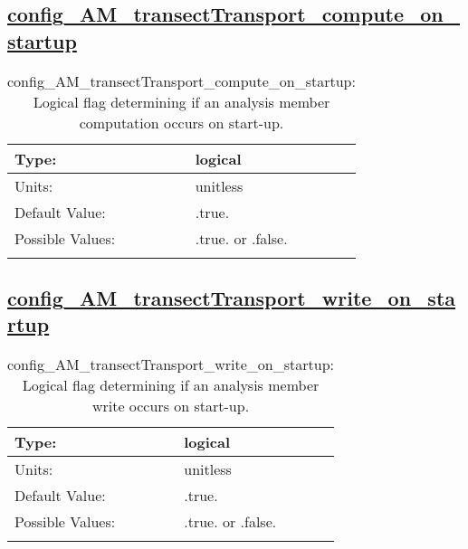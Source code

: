 \subsection[config\_AM\_transectTransport\_compute\_on\_startup]{\hyperref[sec:nm_tab_AM_transectTransport]{config\_AM\_transectTransport\_compute\_on\_startup}}
\label{subsec:nm_sec_config_AM_transectTransport_compute_on_startup}
\begin{center}
\begin{longtable}{| p{2.0in} || p{4.0in} |}
    \hline
    Type: & logical \\
    \hline
    Units: & \si{unitless} \\
    \hline
    Default Value: & .true. \\
    \hline
    Possible Values: & .true. or .false. \\
    \hline
    \caption{config\_AM\_transectTransport\_compute\_on\_startup: Logical flag determining if an analysis member computation occurs on start-up.}
\end{longtable}
\end{center}
\subsection[config\_AM\_transectTransport\_write\_on\_startup]{\hyperref[sec:nm_tab_AM_transectTransport]{config\_AM\_transectTransport\_write\_on\_startup}}
\label{subsec:nm_sec_config_AM_transectTransport_write_on_startup}
\begin{center}
\begin{longtable}{| p{2.0in} || p{4.0in} |}
    \hline
    Type: & logical \\
    \hline
    Units: & \si{unitless} \\
    \hline
    Default Value: & .true. \\
    \hline
    Possible Values: & .true. or .false. \\
    \hline
    \caption{config\_AM\_transectTransport\_write\_on\_startup: Logical flag determining if an analysis member write occurs on start-up.}
\end{longtable}
\end{center}

